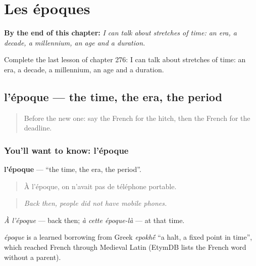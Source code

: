 
\chapter{Les époques}
\label{ch:fr-les-epoques}

\begin{chapteropening}
\textbf{By the end of this chapter:} \emph{I can talk about stretches of time: an era, a decade, a millennium, an age and a duration.}

Complete the last lesson of chapter 276: I can talk about stretches of time: an era, a decade, a millennium, an age and a duration.
\end{chapteropening}

\section[l'époque]{l'époque — the time, the era, the period}

\label{lesson:FR-C276-epoque}



\begin{quote}
Before the new one: say the French for the hitch, then the French for the deadline.
\end{quote}

\subsection*{You'll want to know: l'époque}
\textbf{l'époque} — \textquotedblleft{}the time, the era, the period\textquotedblright{}.

\begin{quote}
À l'époque, on n'avait pas de téléphone portable.
\end{quote}

\begin{quote}
\emph{Back then, people did not have mobile phones.}
\end{quote}

\emph{À l'époque} — back then; \emph{à cette époque-là} — at that time.

\begin{cousinweb}
\emph{époque} is a learned borrowing from Greek \emph{epokh\'{\={e}}} \textquotedblleft{}a halt, a fixed point in time\textquotedblright{}, which reached French through Medieval Latin (EtymDB lists the French word without a parent).
\end{cousinweb}

